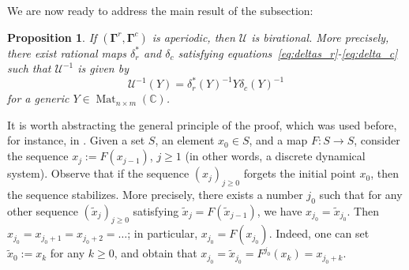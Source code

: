 \documentclass[11pt]{article}
\newcommand{\bg}{\mathbf{\Gamma}}
\DeclareMathOperator{\Mat}{Mat}
\newtheorem{proposition}[theorem]{Proposition}%
\theoremstyle{definition}\newtheorem{definition}[theorem]{Definition}
\theoremstyle{definition}\newtheorem{remark}[theorem]{Remark}
\theoremstyle{remark}
\numberwithin{equation}{section}
\begin{document}
We are now ready to address the main result of the subsection:
\begin{proposition}\label{p:birationality}
    If $(\bg^r,\bg^c)$ is aperiodic, then $\mathcal{U}$ is birational. More precisely, there exist rational maps $\delta_r^*$ and $\delta_c$ satisfying equations~\eqref{eq:deltas_r}-\eqref{eq:delta_c} such that $\mathcal{U}^{-1}$ is given by 
    \begin{equation}\label{eq:Ubirat_inv}
        \mathcal{U}^{-1}(Y) = \delta_r^*(Y)^{-1}Y\delta_c(Y)^{-1}
    \end{equation}
    for a generic $Y \in \Mat_{n\times m}(\mathbb{C})$.
\end{proposition}
It is worth abstracting the general principle of the proof, which was used before, for instance, in \cite[Lemma 4.6]{multdual}. Given a set $S$, an element $x_0 \in S$, and a map $F: S \rightarrow S$, consider the sequence $x_j := F(x_{j-1})$, $j \geq 1$ (in other words, a discrete dynamical system). Observe that if the sequence $(x_j)_{j \geq 0}$ forgets the initial point $x_0$, then the sequence stabilizes. More precisely, there exists a number $j_0$ such that for any other sequence $(\tilde{x}_j)_{j \geq 0}$ satisfying $\tilde{x}_j = F(\tilde{x}_{j-1})$, we have $x_{j_0} = \tilde{x}_{j_0}$. Then $x_{j_0} = x_{j_0+1} = x_{j_0+2} = \ldots$; in particular, $x_{j_0} = F(x_{j_0})$. Indeed, one can set $\tilde{x}_0:=x_{k}$ for any $k \geq 0$, and obtain that $x_{j_0} = \tilde{x}_{j_0} = F^{j_0}(x_k) = x_{j_0+k}$.
\end{document}
